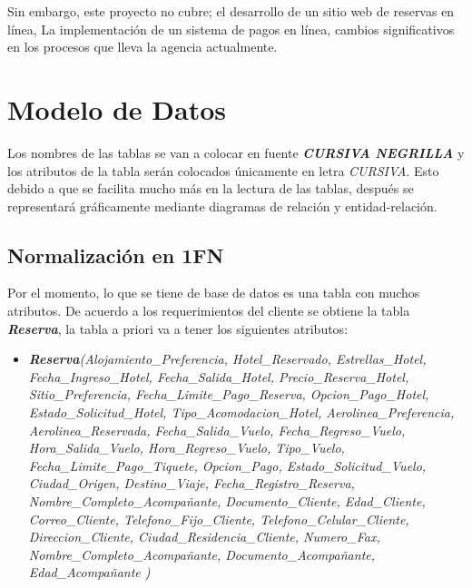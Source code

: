 \documentclass{article}
\begin{document}
Sin embargo, este proyecto no cubre; el desarrollo de un sitio web de reservas en línea, La implementación de un sistema de pagos en línea, cambios significativos en los procesos que lleva la agencia actualmente.

\newpage

\section{Modelo de Datos}
Los nombres de las tablas se van a colocar en fuente \textit{\textbf{CURSIVA NEGRILLA}} y los atributos de la tabla serán colocados únicamente en letra \textit{CURSIVA}. Esto debido a que se facilita mucho más en la lectura de las tablas, después se representará gráficamente mediante diagramas de relación y entidad-relación.
\subsection{Normalización en 1FN}
Por el momento, lo que se tiene de base de datos es una tabla con muchos atributos. De acuerdo a los requerimientos del cliente se obtiene la tabla \textit{\textbf{Reserva}}, la tabla a priori va a tener los siguientes atributos:
\begin{itemize}
    \item \textit{\textbf{Reserva}(Alojamiento\_Preferencia, Hotel\_Reservado, Estrellas\_Hotel, Fecha\_Ingreso\_Hotel, Fecha\_Salida\_Hotel, Precio\_Reserva\_Hotel, Sitio\_Preferencia, Fecha\_Limite\_Pago\_Reserva, Opcion\_Pago\_Hotel, Estado\_Solicitud\_Hotel, Tipo\_Acomodacion\_Hotel, Aerolinea\_Preferencia, Aerolinea\_Reservada, Fecha\_Salida\_Vuelo, Fecha\_Regreso\_Vuelo, Hora\_Salida\_Vuelo, Hora\_Regreso\_Vuelo, Tipo\_Vuelo, Fecha\_Limite\_Pago\_Tiquete, Opcion\_Pago, Estado\_Solicitud\_Vuelo, Ciudad\_Origen, Destino\_Viaje, Fecha\_Registro\_Reserva, Nombre\_Completo\_Acompañante, Documento\_Cliente, Edad\_Cliente, Correo\_Cliente, Telefono\_Fijo\_Cliente, Telefono\_Celular\_Cliente, Direccion\_Cliente, Ciudad\_Residencia\_Cliente, Numero\_Fax, Nombre\_Completo\_Acompañante, Documento\_Acompañante, Edad\_Acompañante )}
\end{itemize}
\end{document}
